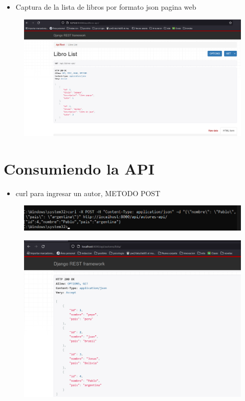 \documentclass{article}
\begin{document}
	\clearpage
	\begin{itemize}
		\item Captura de la lista de libros por formato json pagina web
	\end{itemize}
	\begin{figure}[H]
		\centering
		\includegraphics[width=1\textwidth,keepaspectratio]{pruebas/tarea-libros.png}
	\end{figure}
	\clearpage	
	
	
	\section{Consumiendo la API }
	\begin{itemize}
		\item curl para ingresar un autor, METODO POST
	\end{itemize}
	\begin{figure}[H]
		\centering
		\includegraphics[width=1\textwidth,keepaspectratio]{pruebas/curlIngresarAutor.png}
	\end{figure}
	\begin{figure}[H]
		\centering
		\includegraphics[width=1\textwidth,keepaspectratio]{pruebas/ingresandoAutor.png}
	\end{figure}
	\clearpage
	
\end{document}
